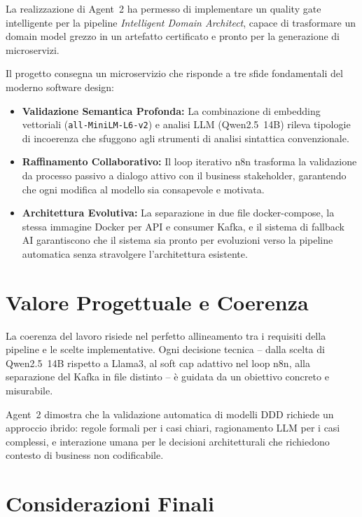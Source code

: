\documentclass[12pt,a4paper]{report}
\begin{document}
La realizzazione di Agent~2 ha permesso di implementare un quality gate
intelligente per la pipeline \textit{Intelligent Domain Architect},
capace di trasformare un domain model grezzo in un artefatto certificato
e pronto per la generazione di microservizi.

Il progetto consegna un microservizio che risponde a tre sfide fondamentali
del moderno software design:

\begin{itemize}
  \item \textbf{Validazione Semantica Profonda:} La combinazione di embedding
        vettoriali (\texttt{all-MiniLM-L6-v2}) e analisi LLM (Qwen2.5~14B)
        rileva tipologie di incoerenza che sfuggono agli strumenti di analisi
        sintattica convenzionale.

  \item \textbf{Raffinamento Collaborativo:} Il loop iterativo n8n trasforma
        la validazione da processo passivo a dialogo attivo con il business
        stakeholder, garantendo che ogni modifica al modello sia consapevole
        e motivata.

  \item \textbf{Architettura Evolutiva:} La separazione in due file
        docker-compose, la stessa immagine Docker per API e consumer Kafka,
        e il sistema di fallback AI garantiscono che il sistema sia pronto
        per evoluzioni verso la pipeline automatica senza stravolgere
        l'architettura esistente.
\end{itemize}

\section{Valore Progettuale e Coerenza}

La coerenza del lavoro risiede nel perfetto allineamento tra i requisiti
della pipeline e le scelte implementative. Ogni decisione tecnica -- dalla
scelta di Qwen2.5~14B rispetto a Llama3, al soft cap adattivo nel loop n8n,
alla separazione del Kafka in file distinto -- è guidata da un obiettivo
concreto e misurabile.

Agent~2 dimostra che la validazione automatica di modelli DDD richiede un
approccio ibrido: regole formali per i casi chiari, ragionamento LLM per
i casi complessi, e interazione umana per le decisioni architetturali
che richiedono contesto di business non codificabile.
\section{Considerazioni Finali}
\end{document}
